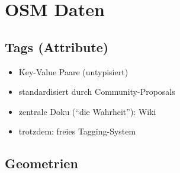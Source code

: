 \documentclass{beamer}
\begin{document}
	\section{OSM Daten}
		
		\begin{frame}
			\tableofcontents[currentsection]
		\end{frame}
		
		\subsection{Tags (Attribute)}
		
			\begin{frame}
				\begin{itemize}
					\item Key-Value Paare (untypisiert)
					\item standardisiert durch Community-Proposals
					\item zentrale Doku (\enquote{die Wahrheit}): Wiki
					\item trotzdem: freies Tagging-System
				\end{itemize}
			\end{frame}
		
		\subsection{Geometrien}
		
\end{document}
